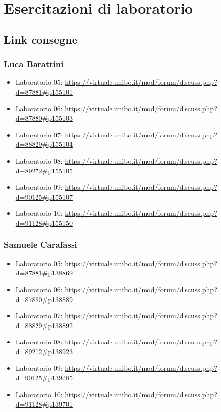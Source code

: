 \chapter{Esercitazioni di laboratorio}

\section{Link consegne}

\subsection{Luca Barattini}

\begin{itemize}
 \item Laboratorio 05: \url{https://virtuale.unibo.it/mod/forum/discuss.php?d=87881#p155101}
 \item Laboratorio 06: \url{https://virtuale.unibo.it/mod/forum/discuss.php?d=87880#p155103}
 \item Laboratorio 07: \url{https://virtuale.unibo.it/mod/forum/discuss.php?d=88829#p155104}
 \item Laboratorio 08: \url{https://virtuale.unibo.it/mod/forum/discuss.php?d=89272#p155105}
 \item Laboratorio 09: \url{https://virtuale.unibo.it/mod/forum/discuss.php?d=90125#p155107}
 \item Laboratorio 10: \url{https://virtuale.unibo.it/mod/forum/discuss.php?d=91128#p155150}
\end{itemize}

\subsection{Samuele Carafassi}

\begin{itemize}
 \item Laboratorio 05: \url{https://virtuale.unibo.it/mod/forum/discuss.php?d=87881#p138869}
 \item Laboratorio 06: \url{https://virtuale.unibo.it/mod/forum/discuss.php?d=87880#p138889}
 \item Laboratorio 07: \url{https://virtuale.unibo.it/mod/forum/discuss.php?d=88829#p138892}
 \item Laboratorio 08: \url{https://virtuale.unibo.it/mod/forum/discuss.php?d=89272#p138923}
 \item Laboratorio 09: \url{https://virtuale.unibo.it/mod/forum/discuss.php?d=90125#p139285}
 \item Laboratorio 10: \url{https://virtuale.unibo.it/mod/forum/discuss.php?d=91128#p139701}
\end{itemize}


